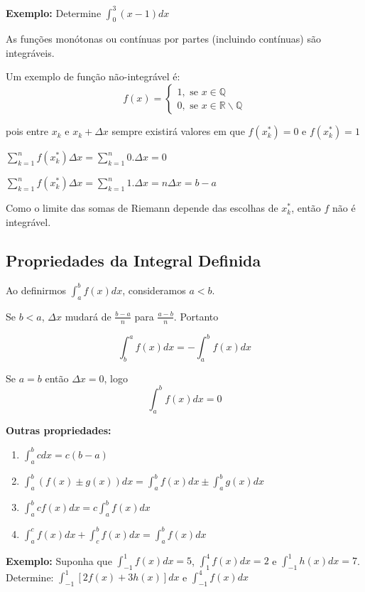 \documentclass[oneside,a4paper,12pt]{article}
\begin{document}
{\bf Exemplo: } Determine $\int_{0}^{3}(x-1)dx$

\vspace{100pt}

As funções monótonas ou contínuas por partes (incluindo contínuas) são integráveis.

Um exemplo de função não-integrável é:
$$f(x) = \begin{cases}
1, \text{ se } x \in \mathbb{Q} \\
0, \text{ se } x \in \mathbb{R}\backslash\mathbb{Q}
\end{cases}
$$

pois entre $x_k$ e $x_k + \Delta x$ sempre existirá valores em que $f(x_{k}^{*}) = 0$ e $f(x_{k}^{*}) = 1$

$\sum_{k=1}^{n}f(x_{k}^{*})\Delta x = \sum_{k=1}^{n}0.\Delta x  = 0$

$\sum_{k=1}^{n}f(x_{k}^{*})\Delta x = \sum_{k=1}^{n}1.\Delta x = n\Delta x = b -a $

Como o limite das somas de Riemann depende das escolhas de $x_{k}^{*}$, então $f$ não é integrável.

\subsection{Propriedades da Integral Definida}

Ao definirmos $\int_{a}^{b}f(x)dx$, consideramos $a<b$.

Se $b<a$, $\Delta x$ mudará de $\frac{b-a}{n}$ para $\frac{a - b}{n}$. Portanto

$$\int_{b}^{a}f(x)dx = - \int_{a}^{b}f(x)dx$$

Se $a=b$ então $\Delta x = 0$, logo  
$$\int_{a}^{b}f(x)dx = 0$$

{\bf Outras propriedades:}
\begin{enumerate}
	\item $\int_{a}^{b}cdx = c(b-a)$
	\item $\int_{a}^{b}(f(x) \pm g(x))dx = \int_{a}^{b}f(x)dx \pm \int_{a}^{b}g(x)dx$
	\item $\int_{a}^{b}cf(x)dx = c\int_{a}^{b}f(x)dx$
	\item $\int_{a}^{c}f(x)dx + \int_{c}^{b}f(x)dx = \int_{a}^{b}f(x)dx$
\end{enumerate}

{\bf Exemplo: } Suponha que $\int_{-1}^{1}f(x)dx = 5$, $\int_{1}^{4}f(x)dx = 2$ e $\int_{-1}^{1}h(x)dx = 7$. Determine:
$\int_{-1}^{1}[2f(x) + 3h(x)]dx$ e $\int_{-1}^{4}f(x)dx$
\end{document}

